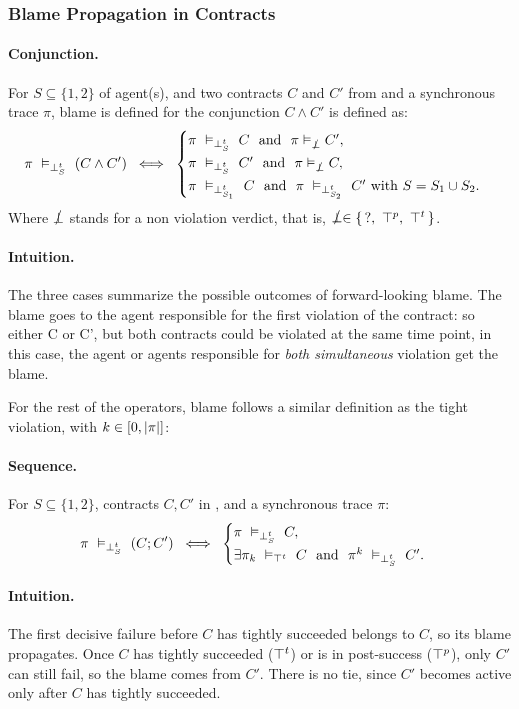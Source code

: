 \subsubsection*{Blame Propagation in Contracts}
\paragraph{Conjunction.}
For $S \subseteq\{1, 2\}$ of agent(s), and  two contracts $C$ and $C'$ from \cDL and a synchronous trace $\pi$, blame is defined for the conjunction $C \wedge C'$ is defined as:
\[
\pi\ \vDash_{\bottp{S}}\ (C\wedge C') \;\iff\;
\begin{cases}
\pi\ \vDash_{\bottp{S}}\ C \ \nd\ \pi \vDash_{\dbot} C',\\[2pt]
\pi\ \vDash_{\bottp{S}}\ C' \ \nd\ \pi \vDash_{\dbot} C,\\[2pt]
\pi\ \vDash_{\bottp{S_1}}\ C\ \nd\ \pi\ \vDash_{\bottp{S_2}}\ C' \text{ with } S=S_1\cup S_2.
\end{cases}
\]
Where $\mathrel{\slashed{\bot}}$ stands for a non violation verdict, that is, $\mathrel{\slashed{\bot}} \in \{\,?,\ \top^p,\ \top^t\,\}$.\\
\paragraph{Intuition.}
The three cases summarize the possible outcomes of forward-looking blame.
The blame goes to the agent responsible for the first violation of the contract: so either C or C', but both contracts could be violated at the same time point, in this case, the agent or agents responsible for \emph{both simultaneous} violation get the blame.

For the rest of the operators,  blame  follows a similar definition as the tight violation, with $k \in [0, \vert \pi\vert]$:
\paragraph{Sequence.}
For \(S\subseteq\{1,2\}\), contracts \(C,C'\) in \cDL, and a synchronous trace \(\pi\):
\[
\pi\ \vDash_{\bottp{S}}\ (C;C') \;\iff\;
\begin{cases}
\pi\ \vDash_{\bottp{S}}\ C,\\[2pt]
\exists \pi_k\ \vDash_{\topt} \ C \ \nd\ \pi^{k}\ \vDash_{\bottp{S}}\ C'.
\end{cases}
\]
\paragraph{Intuition.} The first decisive failure before \(C\) has tightly succeeded belongs to \(C\), so its blame propagates. Once \(C\) has tightly succeeded (\(\top^t\)) or is in post-success (\(\top^p\)), only \(C'\) can still fail, so the blame comes from \(C'\). There is no tie, since \(C'\) becomes active only after \(C\) has tightly succeeded.

